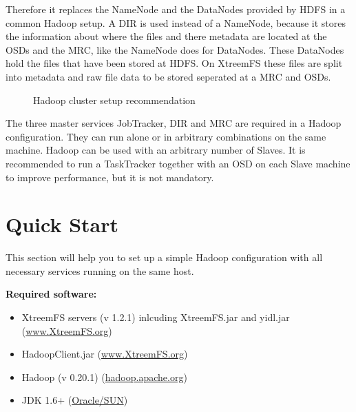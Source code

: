 \documentclass[a4paper,10pt]{book}
\begin{document}
Therefore it replaces the NameNode and the DataNodes provided by HDFS in a common Hadoop setup. A DIR is used instead of a NameNode, because it stores the information about where the files and there metadata are located at the OSDs and the MRC, like the NameNode does for DataNodes. These DataNodes hold the files that have been stored at HDFS. On XtreemFS these files are split into metadata and raw file data to be stored seperated at a MRC and OSDs.

\begin{figure}[h]
 \centering
 \caption{Hadoop cluster setup recommendation}
 \label{fig:cluster_setup}
\end{figure}

The three master services JobTracker, DIR and MRC are required in a Hadoop configuration. They can run alone or in arbitrary combinations on the same machine. Hadoop can be used with an arbitrary number of Slaves. It is recommended to run a TaskTracker together with an OSD on each Slave machine to improve performance, but it is not mandatory.

\section{Quick Start}
\label{sec:hadoop_quickstart}

This section will help you to set up a simple Hadoop configuration with all necessary services running on the same host.

\textbf{Required software:}
\begin{itemize}
\item XtreemFS servers (v 1.2.1) inlcuding XtreemFS.jar and yidl.jar (\href{http://www.XtreemFS.org}{www.XtreemFS.org})
\item HadoopClient.jar (\href{http://www.XtreemFS.org}{www.XtreemFS.org})
\item Hadoop (v 0.20.1) (\href{http://hadoop.apache.org}{hadoop.apache.org})
\item JDK 1.6+ (\href{http://java.sun.com}{Oracle/SUN})
\end{itemize}
\end{document}
